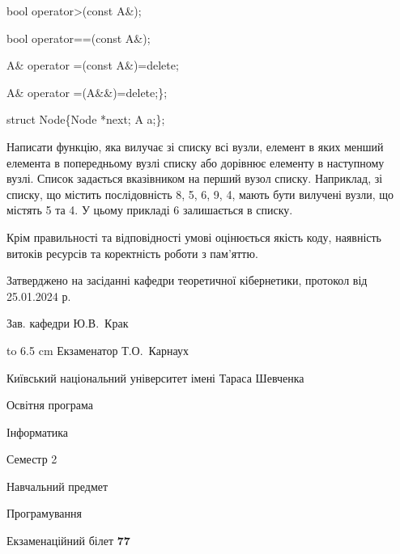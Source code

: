 \documentclass[12pt, ukrainian]{article}
\begin{document}
{\quad  bool operator>(const A\&); 

\quad  bool operator==(const A\&); 

\quad A\& operator =(const A\&)=delete; 

\quad  A\& operator =(A\&\&)=delete;\};

struct Node\{Node *next; A a;\};

 Написати функцію, яка вилучає зі списку всі вузли, елемент в яких менший елемента в попередньому вузлі списку або дорівнює елементу в наступному вузлі. Список задається вказівником на перший вузол списку. Наприклад, зі списку, що містить послідовність 8, 5, 6, 9, 4, мають бути вилучені вузли, що містять 5 та 4. У цьому прикладі 6 залишається в списку.

Крім правильності та відповідності умові оцінюється якість коду, наявність витоків ресурсів та коректність роботи з пам'яттю. 

}
{\smallskip\smallskip \begin {scriptsize} Затверджено на засіданні кафедри теоретичної кібернетики, протокол   від   25.01.2024 р.\par\smallskip\smallskip\smallskip\smallskip
{\parbox {6.5 cm} {Зав. кафедри \dotfill Ю.В.~Крак}}\hspace {0.7cm} {\hbox to 6.5 cm { Екзаменатор \dotfill Т.О.~Карнаух}} \end{scriptsize}}
\newpage
{{\begin {scriptsize}\par
{ \center  Київський національний університет імені Тараса Шевченка \par}
{\parbox {5 cm}{Освітня програма \hfill}{\parbox {7 cm}{Інформатика\hfill}}\parbox {6 cm}{\hfill Семестр 2}}\par
{\parbox {5 cm} {Навчальний предмет \hfill}\parbox {7 cm}{Програмування \hfill}\parbox {6cm}{\hfill}\par}\vspace{-15pt} \end{scriptsize}}{\center Екзаменаційний білет \No \textbf { 77 }\par}}
\end{document}
